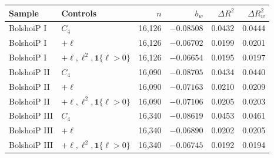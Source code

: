 \begin{tabular}{llrrrr}
\toprule
Sample & Controls & $n$ & $b_w$ & $\Delta R^2$ & $\Delta R^2_w$\\
\midrule
BolshoiP I & $C_4$ & 16,126 & $-0.08508$ & 0.0432 & 0.0444\\
BolshoiP I & $+\ell$ & 16,126 & $-0.06702$ & 0.0199 & 0.0201\\
BolshoiP I & $+\ell,\ell^2,\mathbf1\{\ell>0\}$ & 16,126 & $-0.06654$ & 0.0195 & 0.0197\\
BolshoiP II & $C_4$ & 16,090 & $-0.08705$ & 0.0434 & 0.0440\\
BolshoiP II & $+\ell$ & 16,090 & $-0.07163$ & 0.0210 & 0.0209\\
BolshoiP II & $+\ell,\ell^2,\mathbf1\{\ell>0\}$ & 16,090 & $-0.07106$ & 0.0205 & 0.0203\\
BolshoiP III & $C_4$ & 16,340 & $-0.08619$ & 0.0453 & 0.0461\\
BolshoiP III & $+\ell$ & 16,340 & $-0.06890$ & 0.0202 & 0.0205\\
BolshoiP III & $+\ell,\ell^2,\mathbf1\{\ell>0\}$ & 16,340 & $-0.06745$ & 0.0192 & 0.0194\\
\bottomrule
\end{tabular}
